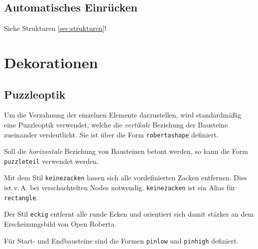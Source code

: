 \documentclass[12pt,a4paper]{ltxdoc}
\newcommand{\ex}[1]{\vspace*{1em} \marginnote{\textbf{\sffamily Bsp:} #1}}
\begin{document}
\ex{einruecken}




\subsection{Automatisches Einrücken}
Siehe Strukturen \ref{sec:strukturen}!


\clearpage
\section{Dekorationen}

\subsection{Puzzleoptik}
\newcommand{\mydeco}[1]{
	\tikz\node[codeblocks,mathe,#1](one){A+B};&#1
}




Um die Verzahnung der einzelnen Elemente darzustellen, wird standardmäßig eine Puzzleoptik verwendet, welche die \textit{vertikale} Beziehung der Bausteine zueinander verdeutlicht. Sie ist über die Form  \lstinline|robertashape| definiert.

Soll die \textit{horizontale} Beziehung von Bausteinen betont werden, so kann die Form  \lstinline|puzzleteil| verwendet werden.

 Mit dem Stil \lstinline|keinezacken| lassen sich alle vordefinierten Zacken entfernen. Dies ist v.\,A. bei verschachtelten Nodes notwendig. \lstinline|keinezacken| ist ein Alias für \lstinline|rectangle|.

 Der Stil \lstinline|eckig| entfernt alle runde Ecken und orientiert sich damit stärker an dem Erscheinungsbild von Open Roberta.

Für Start- und Endbausteine sind die Formen \lstinline|pinlow| und \lstinline|pinhigh| definiert.
\end{document}
